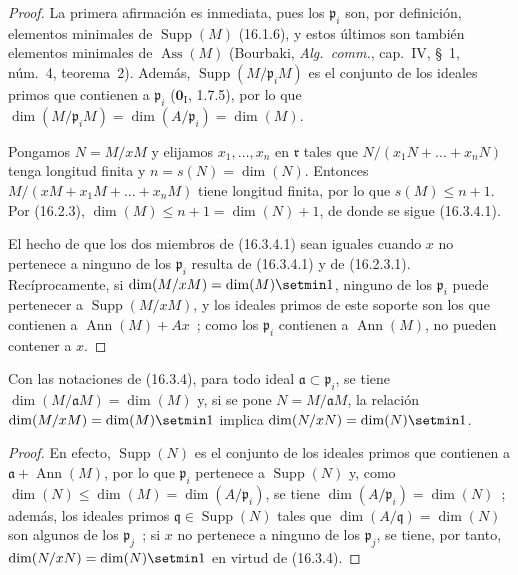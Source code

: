 \begin{proof}
La primera afirmación es inmediata, pues los $\mathfrak{p}_i$ son, por
definición, elementos minimales de $\operatorname{Supp}(M)$ (16.1.6), y estos
últimos son también elementos minimales de $\operatorname{Ass}(M)$ (Bourbaki,
\emph{Alg.~comm.}, cap.~IV, \S~1, núm.~4, teorema~2). Además,
$\operatorname{Supp}(M/\mathfrak{p}_iM)$ es el conjunto de los ideales primos
que contienen a $\mathfrak{p}_i$ ($\mathbf{0}_{\mathrm I}$, 1.7.5), por lo que
$\dim(M/\mathfrak{p}_iM)=\dim(A/\mathfrak{p}_i)=\dim(M)$.

Pongamos $N=M/xM$ y elijamos $x_1,\ldots,x_n$ en $\mathfrak{r}$ tales
que $N/(x_1N+\ldots+x_nN)$ tenga longitud finita y $n=s(N)=\dim(N)$.
Entonces $M/(xM+x_1M+\ldots+x_nM)$ tiene longitud finita, por lo que $s(M)\leq n+1$.
Por (16.2.3), $\dim(M)\leq n+1=\dim(N)+1$, de donde se sigue (16.3.4.1).

El hecho de que los dos miembros de (16.3.4.1) sean iguales cuando $x$ no
pertenece a ninguno de los $\mathfrak{p}_i$ resulta de (16.3.4.1) y de
(16.2.3.1). Recíprocamente, si
$\dim(M/xM)=\dim(M)\setmin 1$, ninguno de los $\mathfrak{p}_i$ puede pertenecer a
$\operatorname{Supp}(M/xM)$, y los ideales primos de este soporte son los que
contienen a $\operatorname{Ann}(M)+Ax$~; como los $\mathfrak{p}_i$ contienen a
$\operatorname{Ann}(M)$, no pueden contener a $x$.
\end{proof}

\begin{corollary}[16.3.5]
\label{0.16.3.5-fr}
Con las notaciones de \textup{(16.3.4)}, para todo ideal
$\mathfrak{a}\subset\mathfrak{p}_i$, se tiene
$\dim(M/\mathfrak{a}M)=\dim(M)$ y, si se pone
$N=M/\mathfrak{a}M$, la relación $\dim(M/xM)=\dim(M)\setmin 1$ implica
$\dim(N/xN)=\dim(N)\setmin 1$.
\end{corollary}

\begin{proof}
En efecto, $\operatorname{Supp}(N)$ es el conjunto de los ideales primos que
contienen a $\mathfrak{a}+\operatorname{Ann}(M)$, por lo que $\mathfrak{p}_i$
pertenece a $\operatorname{Supp}(N)$ y, como
$\dim(N)\leq\dim(M)=\dim(A/\mathfrak{p}_i)$, se tiene
$\dim(A/\mathfrak{p}_i)=\dim(N)$~; además, los ideales primos
$\mathfrak{q}\in\operatorname{Supp}(N)$ tales que
$\dim(A/\mathfrak{q})=\dim(N)$ son algunos de los $\mathfrak{p}_j$~; si $x$
no pertenece a ninguno de los $\mathfrak{p}_j$, se tiene, por tanto,
$\dim(N/xN)=\dim(N)\setmin 1$ en virtud de (16.3.4).
\end{proof}

